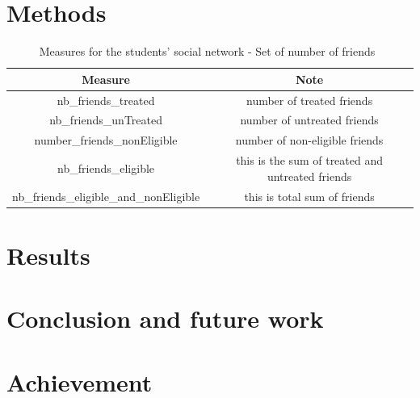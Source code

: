 \documentclass[11pt]{article}
\begin{document}
\section{Methods\label{sec:research_design}}
\begin{table}[H]
    \centering
    \begin{tabular}{ c|c }
        \hline
        \textbf{Measure} & \textbf{Note} \\ \hline
        nb\_friends\_treated &  number of treated friends\\
        nb\_friends\_unTreated & number of untreated friends\\
        number\_friends\_nonEligible & number of non-eligible friends\\
        nb\_friends\_eligible & this is the sum of treated and untreated friends\\
        nb\_friends\_eligible\_and\_nonEligible & this is total sum of friends\\
        \hline
    \end{tabular}
    \caption{Measures for the students' social network - Set of number of friends~\cite{newman2010}}
    \label{table:social_network_measures_1}
\end{table}
\section{Results\label{sec:results}}

\section{Conclusion and future work\label{sec:conclusion_future_work}}

\section{Achievement}




\end{document}
